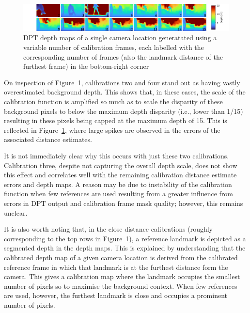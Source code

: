\begin{figure}[H]
    \centering
    \includegraphics[width=1\textwidth]{body/analysis/assets/calibration_effects/variable_calibation}
    \caption{DPT depth maps of a single camera location generatated using a variable number of
        calibration frames, each labelled with the corresponding number of frames (also the landmark
        distance of the furthest frame) in the bottom-right corner}
    \label{fig:variable_calibration}
\end{figure}

On inspection of Figure~\ref{fig:variable_calibration}, calibrations two and four stand out as having
vastly overestimated background depth.
This shows that, in these cases, the scale of the calibration function is amplified so much as to scale
the disparity of these background pixels to below the maximum depth disparity (i.e., lower than 1/15)
resulting in these pixels being capped at the maximum depth of 15.
This is reflected in Figure~\ref{fig:variable_calibration}, where large spikes are observed in the errors
of the associated distance estimates.

It is not immediately clear why this occurs with just these two calibrations.
Calibration three, despite not capturing the overall depth scale, does not show this effect and
correlates well with the remaining calibration distance estimate errors and depth maps.
A reason may be due to instability of the calibration function when few references are used
resulting from a greater influence from errors in DPT output and calibration frame mask quality;
however, this remains unclear.

It is also worth noting that, in the close distance calibrations (roughly corresponding to the top
rows in Figure~\ref{fig:variable_calibration}), a reference landmark is depicted as a segmented depth
in the depth maps.
This is explained by understanding that the calibrated depth map of a given camera location is
derived from the calibrated reference frame in which that landmark is at the furthest distance form
the camera\cite{HAUCKE2022101536}.
This gives a calibration map where the landmark occupies the smallest number of pixels so to maximise
the background context.
When few references are used, however, the furthest landmark is close and occupies a prominent number
of pixels.

